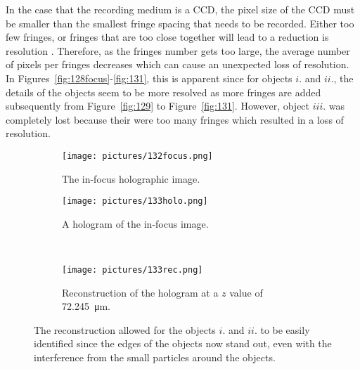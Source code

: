 In the case that the recording medium is a CCD, the pixel size of the CCD must
be smaller than the smallest fringe spacing that needs to be recorded. Either
too few fringes, or fringes that are too close together will lead to a
reduction is resolution \cite{Jericho}. Therefore, as the fringes number gets
too large, the average number of pixels per fringes decreases which can cause
an unexpected loss of resolution. In Figures~\ref{fig:128focus}-\ref{fig:131},
this is apparent since for objects $i.$ and $ii.$, the details of the objects
seem to be more resolved as more fringes are added subsequently from
Figure~\ref{fig:129} to Figure~\ref{fig:131}. However, object $iii.$ was
completely lost because their were too many fringes which resulted in a loss of
resolution.



\begin{figure}[ht!]
    \begin{center}

        \begin{subfigure}[t]{0.4\textwidth}
            \label{fig:132focus}
            \texttt{[image: pictures/132focus.png]}
            \caption{The in-focus holographic image.}
        \end{subfigure}
                \hspace*{\fill}
        \begin{subfigure}[t]{0.4\textwidth}
            \label{fig:133holo}
            \texttt{[image: pictures/133holo.png]}
            \caption{A hologram of the in-focus image.}%
        \end{subfigure}
        \\
        \begin{subfigure}[t]{\textwidth}
            \label{fig:133rec}
            \texttt{[image: pictures/133rec.png]}
            \caption{Reconstruction of the hologram at a $z$ value of \SI{72.245}{\micro\meter}.}
        \end{subfigure}


    \end{center}
    \caption{%
       The reconstruction allowed for the objects $i.$ and $ii.$ to be easily
       identified since the edges of the objects now
       stand out, even with the interference from the small particles around
       the objects.
    }%
    \label{fig:133}
\end{figure}

